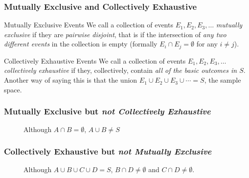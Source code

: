 \documentclass[handout]{beamer}
\begin{document}
\begin{frame}
\frametitle{Mutually Exclusive and Collectively Exhaustive}
\begin{block}{Mutually Exclusive Events}
We call a collection of events $E_1, E_2, E_3, \hdots$ \emph{\alert{mutually exclusive}} if they are \alert{\emph{pairwise disjoint}}, that is if the intersection of \alert{\emph{any two different events}} in the collection is empty (formally $E_i \cap E_j = \emptyset$ for any $i\neq j$).
\end{block}
\pause
\vspace{1em}

\begin{block}{Collectively Exhaustive Events}
We call a collection of events $E_1, E_2, E_3, \hdots$ \emph{\alert{collectively exhaustive}} if they, collectively, contain \alert{\emph{all of the basic outcomes in $S$}}. Another way of saying this is that the union $E_1 \cup E_2 \cup E_3 \cup \cdots = S$, the sample space.
\end{block}
\end{frame}
\def\Srect{(-2,-2) rectangle (4,2)}
\def\Arect{(-2,-2) rectangle (0,2)}
\def\Brect{(0,-2) rectangle (2,2)}
\def\Crect{(0,2) rectangle (4,2)}
\def\Devent{(1.6,-0.3) circle (1.3)}
\def\Eevent{(-1,1.2) circle (0.5)}
\begin{frame}
\frametitle{Mutually Exclusive but \emph{not Collectively Exhaustive}}
\begin{figure}
\centering
{}
\caption{Although $A \cap B = \emptyset$, $A \cup B \neq S$}
\end{figure}
\end{frame}

\begin{frame}
\frametitle{Collectively Exhaustive but \emph{not Mutually Exclusive}}
\begin{figure}
\centering
{}
\caption{Although $A \cup B \cup C \cup D = S$, $B \cap D \neq \emptyset$ and $C \cap D \neq \emptyset$.}
\end{figure}
\end{frame}
\end{document}
